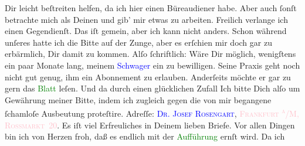                Dir leicht beſtreiten helfen, da ich hier einen Büreaudiener habe. Aber auch ſonſt
               betrachte mich als Deinen \label{K_L02719-2v}\label{K_L02719-2h} und gib’
               mir etwas zu {\pb}arbeiten. Freilich verlange ich einen
               Gegendienſt. Das iſt gemein, aber ich kann nicht anders. Schon während unſeres
                  \label{K_L02719-3v}\label{K_L02719-3h} hatte ich die Bitte auf der Zunge, aber es erſchien mir doch gar zu
               erbärmlich, Dir damit zu kommen. Alſo ſchriftlich: Wäre Dir möglich, wenigſtens ein
               paar Monate lang, meinem \textcolor{blue}{Schwager}{} ein \label{K_L02719-4v}\label{K_L02719-4h} zu bewilligen. Seine Praxis geht noch nicht
                  {\pb}gut genug, ihm ein Abonnement zu erlauben.
               Anderſeits möchte er gar zu gern\strikeout{,} das \textcolor{green}{Blatt}{} leſen. Und da durch einen glücklichen
                  Zufall{\dotsfour} Ich bitte Dich alſo um Gewährung meiner Bitte,
               indem ich zugleich gegen die von mir begangene ſchamloſe Ausbeutung proteſtire.
               Adreſſe: \textsc{\textcolor{blue}{Dr. Josef Rosengart}{}\ledrightnote{\textcolor{blue}{Josef Rosengart}}}, \textsc{\textcolor{pink}{Frankfurt \textsuperscript{a}/M, }{}\ledrightnote{\textcolor{pink}{Frankfurt am Main}}{ }\textcolor{pink}{Rossmarkt 20}{}\ledrightnote{\textcolor{pink}{Roßmarkt}}}.\pend
           \pstart
           Es iſt viel Erfreuliches in Deinem lieben Briefe. Vor allen Dingen bin ich {\pb}von Herzen froh, daß es endlich mit der \textcolor{green}{Aufführung}{} ernſt wird. Da ich

